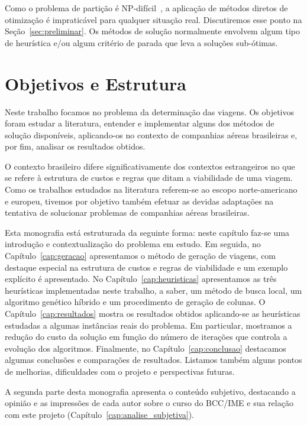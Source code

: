 Como o problema de partição é NP-difícil~\cite{garey79}, a aplicação de métodos diretos de
otimização é impraticável para qualquer situação real. Discutiremos esse ponto na
Seção~\ref{sec:preliminar}. Os métodos de solução normalmente envolvem algum tipo de heurística e/ou
algum critério de parada que leva a soluções sub-ótimas.


\section{Objetivos e Estrutura}
\label{sec:objetivos}

Neste trabalho focamos no problema da determinação das viagens. Os objetivos foram estudar a 
literatura, entender e implementar alguns dos métodos de solução disponíveis, aplicando-os
no contexto de companhias aéreas brasileiras e, por fim, analisar os resultados obtidos.

O contexto brasileiro difere significativamente dos contextos estrangeiros no que se refere à 
estrutura de custos e regras que ditam a viabilidade de uma viagem. Como os trabalhos estudados na
literatura referem-se ao escopo norte-americano e europeu, tivemos por objetivo também efetuar as 
devidas adaptações na tentativa de solucionar problemas de companhias aéreas brasileiras.

Esta monografia está estruturada da seguinte forma: neste capítulo faz-se uma introdução e
contextualização do problema em estudo. Em seguida, no Capítulo~\ref{cap:geracao} apresentamos o
método de geração de viagens, com destaque especial na estrutura de custos e regras de viabilidade e
um exemplo explícito é apresentado. No Capítulo~\ref{cap:heuristicas} apresentamos as três
heurísticas implementadas neste trabalho, a saber, um método de busca local, um algoritmo genético
híbrido e um procedimento de geração de colunas. O Capítulo~\ref{cap:resultados} mostra os
resultados obtidos aplicando-se as heurísticas estudadas a algumas instâncias reais do problema. Em
particular, mostramos a redução do custo da solução em função do número de iterações que controla a
evolução dos algoritmos. Finalmente, no Capítulo~\ref{cap:conclusao} destacamos algumas conclusões e
comparações de resultados. Listamos também alguns pontos de melhorias, dificuldades com o projeto e
perspectivas futuras.

A segunda parte desta monografia apresenta o conteúdo subjetivo, destacando a opinião e as
impressões de cada autor sobre o curso do BCC/IME e sua relação com este projeto
(Capítulo~\ref{cap:analise_subjetiva}).
